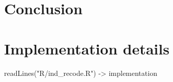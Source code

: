 \hypertarget{conclusion}{%
\section{Conclusion}\label{conclusion}}

\hypertarget{implementation-details}{%
\section{Implementation details}\label{implementation-details}}

\begin{Schunk}
\begin{Sinput}
readLines("R/ind_recode.R") -> implementation
\end{Sinput}
\end{Schunk}

